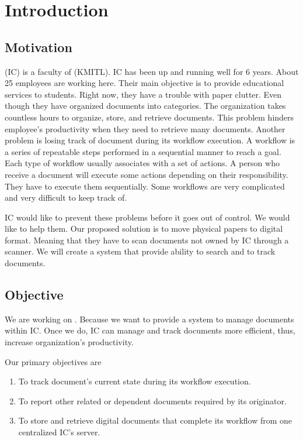 \chapter{Introduction}

\section{Motivation}
\IC (IC) is a faculty of \kmitl (KMITL). 
IC has been up and running well for 6 years.
About 25 employees are working here.
Their main objective is to provide educational services to students. 
Right now, they have a trouble with paper clutter. 
Even though they have organized documents into categories. 
The organization takes countless hours to organize, store, and retrieve documents.
This problem hinders employee's productivity when they need to retrieve many documents. 
Another problem is losing track of document during its workflow execution. 
A workflow is a series of repeatable steps performed in a sequential manner to reach a goal.
Each type of workflow usually associates with a set of actions. 
A person who receive a document will execute some actions depending on their responsibility.
They have to execute them sequentially. 
Some workflows are very complicated and very difficult to keep track of.

IC would like to prevent these problems before it goes out of control. 
We would like to help them. 
Our proposed solution is to move physical papers to digital format. 
Meaning that they have to scan documents not owned by IC through a scanner. 
We will create a system that provide ability to search and to track documents.

\section{Objective}
We are working on \dms.
Because we want to provide a system to manage documents within IC.
Once we do, IC can manage and track documents more efficient, thus, increase organization's productivity.

Our primary objectives are
\begin{enumerate}
\item To track document's current state during its workflow execution.
\item To report other related or dependent documents required by its originator.
\item To store and retrieve digital documents that complete its workflow from one centralized IC's server.
\end{enumerate}

